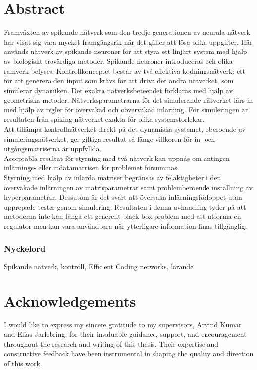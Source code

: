 \chapter*{Abstract}
Framväxten av spikande nätverk som den tredje generationen av neurala nätverk har visat sig vara mycket framgångsrik när det gäller att lösa olika uppgifter. Här används nätverk av spikande neuroner för att styra ett linjärt system med hjälp av biologiskt trovärdiga metoder. Spikande neuroner introduceras och olika ramverk belyses. Kontrollkonceptet består av två effektiva kodningsnätverk: ett för att generera den input som krävs för att driva det andra nätverket, som simulerar dynamiken. Det exakta nätverksbeteendet förklaras med hjälp av geometriska metoder. Nätverksparametrarna för det simulerande nätverket lärs in med hjälp av regler för övervakad och oövervakad inlärning.
För simuleringen är resultaten från spiking-nätverket exakta för olika systemstorlekar.\\
Att tillämpa kontrollnätverket direkt på det dynamiska systemet, oberoende av simuleringsnätverket, ger giltiga resultat så länge villkoren för in- och utgångsmatriserna är uppfyllda.\\
Acceptabla resultat för styrning med två nätverk kan uppnås om antingen inlärnings- eller indatamatrisen för problemet försummas.\\
Styrning med hjälp av inlärda matriser begränsas av felaktigheter i den övervakade inlärningen av matrisparametrar samt problemberoende inställning av hyperparametrar. Dessutom är det svårt att övervaka inlärningsförloppet utan upprepade tester genom simulering.
Resultaten i denna avhandling tyder på att metoderna inte kan fånga ett generellt black box-problem med att utforma en regulator men kan vara användbara när ytterligare information finns tillgänglig.

\subsection*{Nyckelord}
Spikande nätverk, kontroll, Efficient Coding networks, lärande

\newpage
\thispagestyle{plain}
\chapter*{Acknowledgements}


I would like to express my sincere gratitude to my supervisors, Arvind Kumar and Elias Jarlebring, for their invaluable guidance, support, and encouragement throughout the research and writing of this thesis. Their expertise and constructive feedback have been instrumental in shaping the quality and direction of this work.


